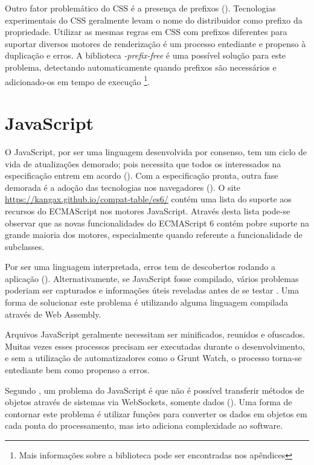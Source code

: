 Outro fator problemático do CSS é a presença de prefixos
(). Tecnologias experimentais do CSS geralmente
levam o nome do distribuidor como prefixo da propriedade. Utilizar as
mesmas regras em CSS com prefixos diferentes para suportar diversos
motores de renderização é um processo entediante e propenso à
duplicação e erros. A biblioteca \textit{-prefix-free} é uma
possível solução para este problema, detectando automaticamente
quando prefixos são necessários e adicionado-os em tempo de execução
\footnote{Mais informações sobre a biblioteca pode ser encontradas nos
apêndices}.

\section{JavaScript}

O JavaScript, por ser uma linguagem desenvolvida por consenso,
tem um ciclo de vida de atualizações demorado; pois necessita
que todos os interessados na especificação entrem em acordo
(). Com a especificação
pronta, outra fase demorada é a adoção das tecnologias
nos navegadores (). O site
\url{https://kangax.github.io/compat-table/es6/} contém uma lista do
suporte aos recursos do ECMAScript nos motores JavaScript. Através
desta lista pode-se observar que as novas funcionalidades do ECMAScript
6 contém pobre suporte na grande maioria dos motores, especialmente
quando referente a funcionalidade de subclasses.

Por ser uma linguagem interpretada, erros tem de descobertos rodando a
aplicação (). Alternativamente,
se JavaScript fosse compilado, vários problemas poderiam ser capturados
e informações úteis reveladas antes de se testar \autocite[p.
12]{viabilityBusinessApplications}. Uma forma de solucionar 
este problema é utilizando alguma linguagem compilada através de 
Web Assembly.

Arquivos JavaScript geralmente necessitam ser minificados, reunidos e
ofuscados. Muitas vezes esses processos precisam ser executadas durante
o desenvolvimento, e sem a utilização de automatizadores como o Grunt
Watch, o processo torna-se entediante bem como propenso a erros.

Segundo \citet{htmlResearchJournal}, um problema do JavaScript é que
não é possível transferir métodos de objetos através de sistemas
via WebSockets, somente dados ().
Uma forma de contornar este problema é utilizar funções para
converter os dados em objetos em cada ponta do processamento, mas isto
adiciona complexidade ao software.

